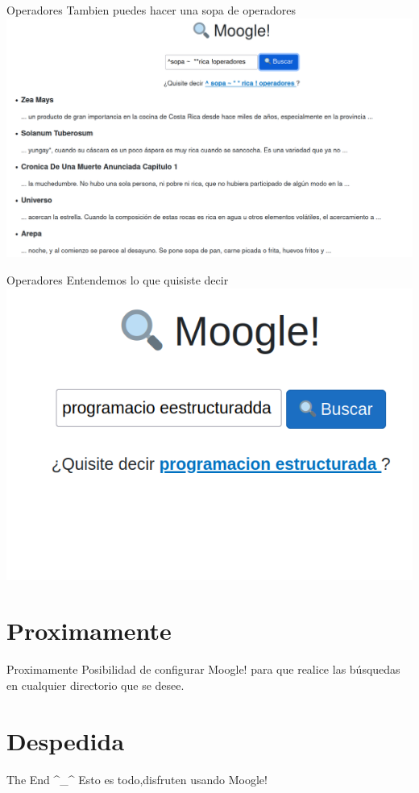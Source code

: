 \documentclass{beamer}
\begin{document}
\begin{frame}{Operadores}
    Tambien puedes hacer una sopa de operadores\\
    \includegraphics[scale = 0.2]{Imagenes/Operadores4.png}
\end{frame}

\begin{frame}{Operadores}
    Entendemos lo que quisiste decir\\
    \bigskip
    \includegraphics[scale=0.2]{Imagenes/programacion_estructurada.png}
\end{frame}

\section{Proximamente}

\begin{frame}{Proximamente}
    Posibilidad de configurar Moogle! para que realice las búsquedas en cualquier directorio que se desee.\\
\end{frame}


\section{Despedida}

\begin{frame}{The End \^{}\_\^{}}
    Esto es todo,disfruten usando Moogle!
\end{frame}
\end{document}
